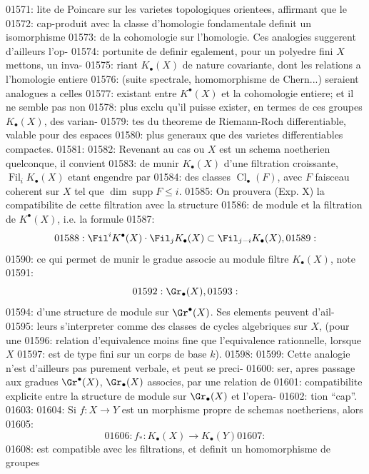 01571: lite de Poincare sur les varietes topologiques orientees, affirmant que le
01572: cap-produit avec la classe d'homologie fondamentale definit un isomorphisme
01573: de la cohomologie sur l'homologie. Ces analogies suggerent d'ailleurs l'op-
01574: portunite de definir egalement, pour un polyedre fini $X$ mettons, un inva-
01575: riant $K_{\bullet}(X)$ de nature covariante, dont les relations a l'homologie entiere
01576: (suite spectrale, homomorphisme de Chern...) seraient analogues a celles
01577: existant entre $K^{\bullet}(X)$ et la cohomologie entiere; et il ne semble pas non
01578: plus exclu qu'il puisse exister, en termes de ces groupes $K_{\bullet}(X)$, des varian-
01579: tes du theoreme de Riemann-Roch differentiable, valable pour des espaces
01580: plus generaux que des varietes differentiables compactes.
01581: 
01582: Revenant au cas ou $X$ est un schema noetherien quelconque, il convient
01583: de munir $K_{\bullet}(X)$ d'une filtration croissante, $\operatorname{Fil}_i K_{\bullet}(X)$ etant engendre par
01584: des classes $\operatorname{Cl}_{\bullet}(F)$, avec $F$ faisceau coherent sur $X$ tel que $\dim \operatorname{supp} F \leq i$.
01585: On prouvera (Exp. X) la compatibilite de cette filtration avec la structure
01586: de module et la filtration de $K^{\bullet}(X)$, i.e. la formule
01587: \begin{equation}
01588: \Fil^i K^{\bullet}(X) \cdot \Fil_j K_{\bullet}(X) \subset \Fil_{j-i} K_{\bullet}(X),
01589: \end{equation}
01590: ce qui permet de munir le gradue associe au module filtre $K_{\bullet}(X)$, note
01591: \[
01592: \Gr_{\bullet}(X),
01593: \]
01594: d'une structure de module sur $\Gr^{\bullet}(X)$. Ses elements peuvent d'ail-
01595: leurs s'interpreter comme des classes de cycles algebriques sur $X$, (pour une
01596: relation d'equivalence moins fine que l'equivalence rationnelle, lorsque $X$
01597: est de type fini sur un corps de base $k$).
01598: 
01599: Cette analogie n'est d'ailleurs pas purement verbale, et peut se preci-
01600: ser, apres passage aux gradues $\Gr^{\bullet}(X)$, $\Gr_{\bullet}(X)$ associes, par une relation de
01601: compatibilite explicite entre la structure de module sur $\Gr_{\bullet}(X)$ et l'opera-
01602: tion ``cap''.
01603: 
01604: Si $f: X \to Y$ est un morphisme propre de schemas noetheriens, alors
01605: \begin{equation}
01606: f_{*}: K_{\bullet}(X) \longrightarrow K_{\bullet}(Y)
01607: \end{equation}
01608: est compatible avec les filtrations, et definit un homomorphisme de groupes
